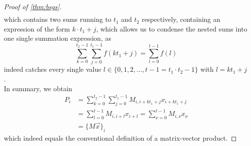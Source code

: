 \begin{proof}[Proof of \cref{thm:bsgs}]
\begin{align*}
  \end{align*}
  which contains two sums running to $t_1$ and $t_2$ respectively, containing an expression of the form $k \cdot t_1 + j$, which allows us to condense the nested sums into one single summation expression, as $$\sum_{k=0}^{t_2-1} \sum_{j=0}^{t_1-1} f(kt_1+j) = \sum_{l=0}^{t-1} f(l)$$ indeed catches every single value $l \in \{0, 1, 2, ..., t - 1 = t_1 \cdot t_2 - 1\}$ with $l = kt_1+j$. \\
  In summary, we obtain
  \begin{align*}
    P_i & = \sum_{k=0}^{t_2-1} \sum_{j=0}^{t_1-1} M_{i,i+kt_1+j} x_{i+kt_1+j} \\
        & = \sum_{l=0}^{t-1} M_{i,i+l} x_{i+l}
    = \sum_{\nu=0}^{t-1} M_{i,\nu} x_{\nu}                                    \\
        & = \big\{M \vec{x}\big\}_i
  \end{align*}
  which indeed equals the conventional definition of a matrix-vector product.
\end{proof}
